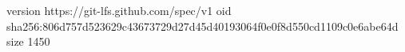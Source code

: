 version https://git-lfs.github.com/spec/v1
oid sha256:806d757d523629c43673729d27d45d40193064f0e0f8d550cd1109c0e6abe64d
size 1450
